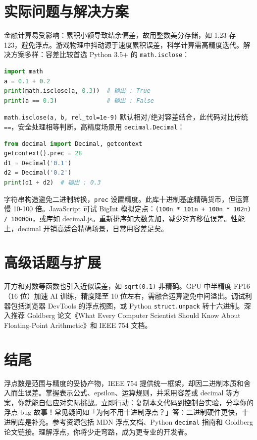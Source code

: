 \chapter{实际问题与解决方案}
金融计算易受影响：累积小额导致结余偏差，故用整数美分存储，如 1.23 存 123，避免浮点。游戏物理中抖动源于速度累积误差，科学计算需高精度迭代。解决方案多样：容差比较首选 Python 3.5+ 的 \texttt{math.isclose}：\par
\begin{lstlisting}[language=python]
import math
a = 0.1 + 0.2
print(math.isclose(a, 0.3))  # 输出 : True
print(a == 0.3)              # 输出 : False
\end{lstlisting}
\texttt{math.isclose(a, b, rel\_{}tol=1e-9)} 默认相对/绝对容差结合，此代码对比传统 \texttt{==}，安全处理相等判断。高精度场景用 \texttt{decimal.Decimal}：\par
\begin{lstlisting}[language=python]
from decimal import Decimal, getcontext
getcontext().prec = 28
d1 = Decimal('0.1')
d2 = Decimal('0.2')
print(d1 + d2)  # 输出 : 0.3
\end{lstlisting}
字符串构造避免二进制转换，\texttt{prec} 设置精度。此库十进制基底精确货币，但运算慢 10-100 倍。JavaScript 可试 BigInt 模拟定点：\texttt{(100n * 101n + 100n * 102n) / 10000n}，或库如 decimal.js。重新排序如大数先加，减少对齐移位误差。性能上，decimal 开销高适合精确场景，日常用容差足矣。\par
\chapter{高级话题与扩展}
开方和对数等函数也引入近似误差，如 \texttt{sqrt(0.1)} 非精确。GPU 中半精度 FP16（16 位）加速 AI 训练，精度降至 10 位左右，需融合运算避免中间溢出。调试利器包括浏览器 DevTools 的浮点视图，或 Python \texttt{struct.unpack} 转十六进制。深入推荐 Goldberg 论文《What Every Computer Scientist Should Know About Floating-Point Arithmetic》和 IEEE 754 文档。\par
\chapter{结尾}
浮点数是范围与精度的妥协产物，IEEE 754 提供统一框架，却因二进制本质和舍入而生误差。掌握表示公式、epsilon、运算规则，并采用容差或 decimal 等方案，你就能自信应对实际挑战。立即行动：复制本文代码到控制台实验，分享你的浮点 bug 故事！常见疑问如「为何不用十进制浮点？」答：二进制硬件更快，十进制库是补充。参考资源包括 MDN 浮点文档、Python \texttt{decimal} 指南和 Goldberg 论文链接。理解浮点，你将少走弯路，成为更专业的开发者。\par
